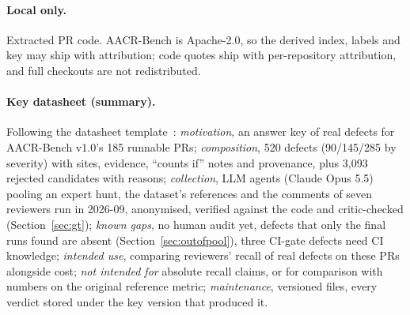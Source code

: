 \documentclass[11pt,a4paper]{article}
\begin{document}
\paragraph{Local only.} Extracted PR code. AACR-Bench is Apache-2.0, so the derived index, labels and key may
ship with attribution; code quotes ship with per-repository attribution, and
full checkouts are not redistributed.

\paragraph{Key datasheet (summary).} Following the datasheet
template~\cite{gebru2021datasheets}: \emph{motivation}, an answer key of real
defects for AACR-Bench v1.0's 185 runnable PRs; \emph{composition}, 520
defects (90/145/285 by severity) with sites, evidence, ``counts if'' notes and
provenance, plus 3{,}093 rejected candidates with reasons; \emph{collection},
LLM agents (Claude Opus 5.5) pooling an expert hunt, the dataset's
references and the comments of seven reviewers run in 2026-09, anonymised,
verified against the code and critic-checked (Section~\ref{sec:gt});
\emph{known gaps}, no human audit yet, defects that only the final runs found
are absent (Section~\ref{sec:outofpool}), three CI-gate defects need CI
knowledge; \emph{intended use}, comparing reviewers' recall of real defects
on these PRs alongside cost; \emph{not intended for} absolute recall
claims, or for comparison with numbers on the original reference metric;
\emph{maintenance}, versioned files, every verdict stored under the key
version that produced it.
\end{document}
